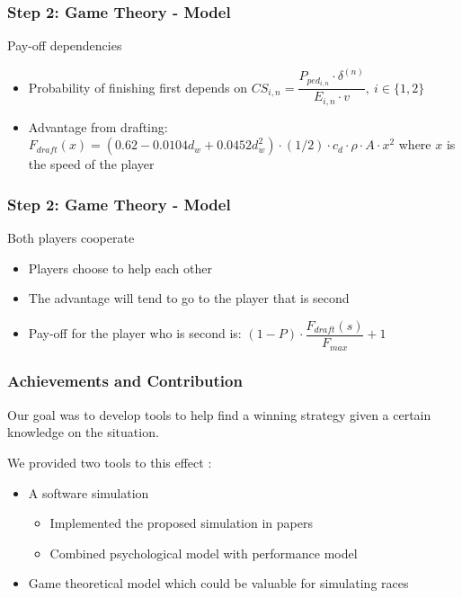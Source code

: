 \documentclass{beamer}
\begin{document}
\begin{frame}
\frametitle{Step 2: Game Theory - Model}
\begin{block}{Pay-off dependencies}
	\begin{itemize}
		\item Probability of finishing first depends on $CS_{i,n} = \dfrac{P_{ped_{i,n}} \cdot \delta^{(n)}}{E_{i,n} \cdot v},\ i\in\{1,2\}$
		\item Advantage from drafting: $F_{draft}(x) = (0.62 - 0.0104 d_w + 0.0452 d_w^2)\cdot (1/2)\cdot c_d\cdot \rho\cdot A\cdot x^2$ where $x$ is the speed of the player
	\end{itemize}
\end{block}
\end{frame}

\begin{frame}
\frametitle{Step 2: Game Theory - Model}
\begin{block}{Both players cooperate}
	\begin{itemize}
		\item Players choose to help each other
		\item The advantage will tend to go to the player that is second
		\item Pay-off for the player who is second is: $(1-P)\cdot \dfrac{F_{draft}(s)}{F_{max}} + 1$
	\end{itemize}
\end{block}
\end{frame}

\begin{frame}
\frametitle{Achievements and Contribution}

Our goal was to develop tools to help find a winning strategy given a certain knowledge on the situation. \\

\pause
\vspace{0.3cm}

We provided two tools to this effect :
\pause
\begin{itemize}
\item A software simulation
  \begin{itemize}
	\item Implemented the proposed simulation in papers \vspace{0.1cm}
	\item Combined psychological model with performance model \vspace{0.1cm}
  \end{itemize}
\pause
\item Game theoretical model which could be valuable for simulating races \vspace{0.1cm}
\end{itemize}

\end{frame}
\end{document}
